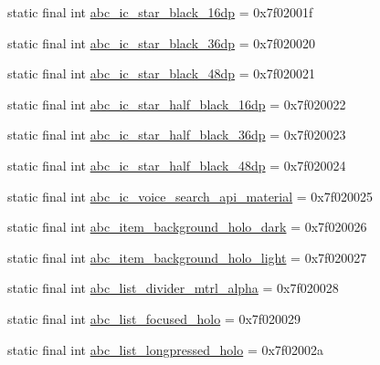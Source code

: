 \begin{CompactItemize}
\item 
static final int \hyperlink{classandroid_1_1support_1_1graphics_1_1drawable_1_1_r_1_1drawable_1621056908611b9950c05716eac59c7a}{abc\_\-ic\_\-star\_\-black\_\-16dp} = 0x7f02001f
\item 
static final int \hyperlink{classandroid_1_1support_1_1graphics_1_1drawable_1_1_r_1_1drawable_c7043a312b3d6d1dbfbb89b4a1bc325a}{abc\_\-ic\_\-star\_\-black\_\-36dp} = 0x7f020020
\item 
static final int \hyperlink{classandroid_1_1support_1_1graphics_1_1drawable_1_1_r_1_1drawable_79688f0826488fa8b3663bf053660552}{abc\_\-ic\_\-star\_\-black\_\-48dp} = 0x7f020021
\item 
static final int \hyperlink{classandroid_1_1support_1_1graphics_1_1drawable_1_1_r_1_1drawable_23811647b466e380c544e8fdb67b609d}{abc\_\-ic\_\-star\_\-half\_\-black\_\-16dp} = 0x7f020022
\item 
static final int \hyperlink{classandroid_1_1support_1_1graphics_1_1drawable_1_1_r_1_1drawable_1ecebb6c78dc711c45e760c1d325eecc}{abc\_\-ic\_\-star\_\-half\_\-black\_\-36dp} = 0x7f020023
\item 
static final int \hyperlink{classandroid_1_1support_1_1graphics_1_1drawable_1_1_r_1_1drawable_f5f555b70daf610169910ca822f639cb}{abc\_\-ic\_\-star\_\-half\_\-black\_\-48dp} = 0x7f020024
\item 
static final int \hyperlink{classandroid_1_1support_1_1graphics_1_1drawable_1_1_r_1_1drawable_c7cba5f9914b95239134e3147ccd533b}{abc\_\-ic\_\-voice\_\-search\_\-api\_\-material} = 0x7f020025
\item 
static final int \hyperlink{classandroid_1_1support_1_1graphics_1_1drawable_1_1_r_1_1drawable_e9a479094765907c58497b180d0dae70}{abc\_\-item\_\-background\_\-holo\_\-dark} = 0x7f020026
\item 
static final int \hyperlink{classandroid_1_1support_1_1graphics_1_1drawable_1_1_r_1_1drawable_22555b56658a32b06d70796bc9457072}{abc\_\-item\_\-background\_\-holo\_\-light} = 0x7f020027
\item 
static final int \hyperlink{classandroid_1_1support_1_1graphics_1_1drawable_1_1_r_1_1drawable_9d098492d8ec5d9993bb54f6cc86ace5}{abc\_\-list\_\-divider\_\-mtrl\_\-alpha} = 0x7f020028
\item 
static final int \hyperlink{classandroid_1_1support_1_1graphics_1_1drawable_1_1_r_1_1drawable_e0353c6304848872ff3fbaa910808188}{abc\_\-list\_\-focused\_\-holo} = 0x7f020029
\item 
static final int \hyperlink{classandroid_1_1support_1_1graphics_1_1drawable_1_1_r_1_1drawable_9f1c2f12948f7eceede4dcedbdd44cd4}{abc\_\-list\_\-longpressed\_\-holo} = 0x7f02002a

\end{CompactItemize}
